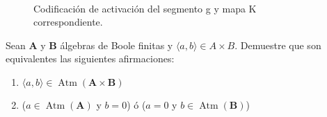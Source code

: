 \begin{figure}[!hbp]
  \centering
  \mbox{
  }
  \caption{\label{fg:segmentoG} Codificación de activación del segmento g y mapa K correspondiente.}
\end{figure}

\begin{exercise}
  \label{ex:atm_prod}
  Sean $\mathbf{A}$ y $\mathbf{B}$ álgebras de Boole finitas y $\langle
  a,b\rangle\in A\times B$. Demuestre que son equivalentes las
  siguientes afirmaciones:
  \begin{enumerate}
  \item
    $\langle a,b\rangle\in
    \operatorname{Atm}(\mathbf{A}\times\mathbf{B})$ \label{ex:atm_prod_A}
  \item ($a\in \operatorname{Atm}(\mathbf{A})$ y $b=0$) ó ($a=0$ y
    $b\in \operatorname{Atm}(\mathbf{B})$) \label{ex:atm_prod_B}
  \end{enumerate}
\end{exercise}

